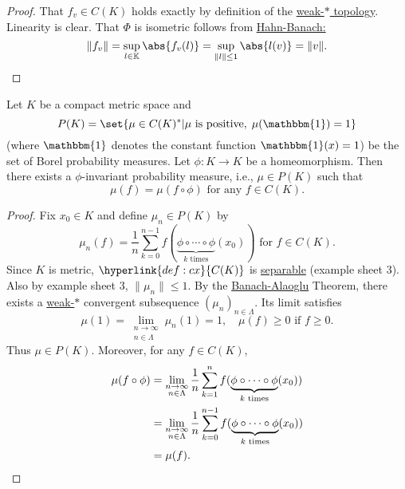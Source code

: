 \documentclass{article}
\newcommand{\K}{\mathbb{K}}
\begin{document}
\begin{proof}
    That $f_v \in C(K)$ holds exactly by definition of the \hyperlink{def:weaktop}{weak-$*$ topology}.
    Linearity is clear. That $\Phi$ is isometric follows from \hyperlink{thm:hahnBanach}{Hahn-Banach:}
    \begin{equation*}
        \|f_v\| = \sup_{l \in \K} \abs{f_v(l)} = \sup_{\|l\| \leq 1} \abs{l(v)} = \|v\|. \qedhere
    \end{equation*}
\end{proof}

\begin{eg}
    Let $K$ be a compact metric space and
    \begin{equation*}
        P(K) = \set{\mu \in C(K)^* | \mu \text{ is positive}, \; \mu(\mathbbm{1}) = 1}
    \end{equation*}
    (where $\mathbbm{1}$ denotes the constant function $\mathbbm{1}(x) = 1$) be the set of Borel probability measures.
    Let $\phi: K \to K$ be a homeomorphism. Then there exists a $\phi$-invariant probability measure, i.e., $\mu \in P(K)$ such that
    \begin{equation*}
        \mu(f) = \mu(f \circ \phi) \text{ for any }f \in C(K).
    \end{equation*}
\end{eg}

\begin{proof}
    Fix $x_0 \in K$ and define $\mu_n \in P(K)$ by
    \begin{equation*}
        \mu_n(f) = \frac{1}{n} \sum_{k=0}^{n-1} f(\underbrace{\phi \circ \dotsb \circ \phi}_{k \text{ times}} (x_0)) \text{ for } f \in C(K).
    \end{equation*}
    Since $K$ is metric, $\hyperlink{def:cx}{C(K)}$ is \hyperlink{def:separable}{separable} (example sheet 3). Also by example sheet 3, $\|\mu_n\| \leq 1$.
    By the \hyperlink{thm:bab}{Banach-Alaoglu} Theorem, there exists a \hyperlink{def:weaktop}{weak-$*$} convergent subsequence $(\mu_n)_{n \in \Lambda}$.
    Its limit satisfies
    \begin{equation*}
        \mu(1) = \lim_{\substack{n \to \infty \\ n \in \Lambda}} \mu_n(1) = 1, \quad \mu(f) \geq 0 \text{ if } f \geq 0.
    \end{equation*}
    Thus $\mu \in P(K)$. Moreover, for any $f \in C(K)$,
    \begin{align*}
        \mu(f \circ \phi) &= \lim_{\substack{n \to \infty \\ n \in \Lambda}} \frac{1}{n} \sum_{k=1}^n f(\underbrace{\phi \circ \dotsb \circ \phi}_{k \text{ times}} (x_0)) \\
                          &= \lim_{\substack{n \to \infty \\ n \in \Lambda}} \frac{1}{n} \sum_{k=0}^{n-1} f(\underbrace{\phi \circ \dotsb \circ \phi}_{k \text{ times}} (x_0)) \\
                          &= \mu(f).\qedhere
    \end{align*}
\end{proof}
\end{document}
